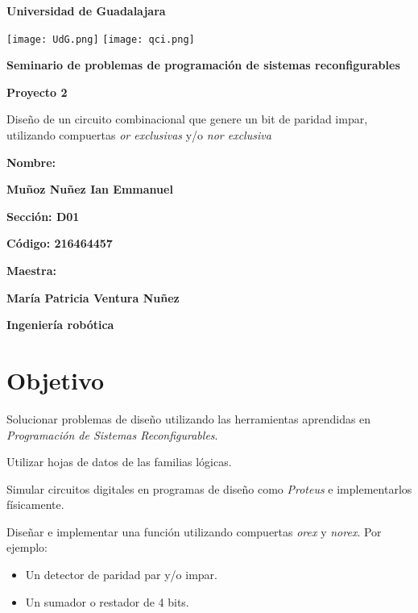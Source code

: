 \documentclass[12pt, oneside, openany]{article}
\begin{document}
\begin{titlepage}
    \centering
    {\bfseries\LARGE Universidad de Guadalajara \par}
    \vfill
    {
        \texttt{[image: UdG.png]}
        \texttt{[image: qci.png]}
        \par
    }
    \vfill
    {\bfseries\LARGE Seminario de problemas de programación de sistemas reconfigurables \par}
    \vfill
    {\bfseries\LARGE Proyecto 2 \par}
    \vfill
    {\LARGE Diseño de un circuito combinacional que genere un bit de paridad impar, utilizando compuertas \emph{or exclusivas} y/o \emph{nor exclusiva} \par}
    \vfill
    {\bfseries\LARGE Nombre: \par}
    \vfill
    {\bfseries\LARGE Muñoz Nuñez Ian Emmanuel \par}
    \vfill
    {\bfseries\LARGE Sección: D01 \par}
    \vfill
    {\bfseries\LARGE Código: 216464457 \par}
    \vfill
    {\bfseries\LARGE Maestra: \par}
    \vfill
    {\bfseries\LARGE María Patricia Ventura Nuñez \par}
    \vfill
    {\bfseries\LARGE Ingeniería robótica \par}
\end{titlepage}

\newpage

\section{Objetivo}
{\sffamily\Large
    \hspace{0.5cm} Solucionar problemas de diseño utilizando las herramientas aprendidas en \emph{Programación de Sistemas Reconfigurables}.
    
    \hspace{0.5cm} Utilizar hojas de datos de las familias lógicas.
    
    \hspace{0.5cm}Simular circuitos digitales en programas de diseño como \emph{Proteus\texttrademark} e implementarlos físicamente.
    
    \hspace{0.5cm} Diseñar e implementar una función utilizando compuertas \emph{orex} y \emph{norex}. Por ejemplo:
    
    \renewcommand{\labelitemi}{-}
    \begin{itemize}
        \item Un detector de paridad par y/o impar.
        \item Un sumador o restador de 4 bits.
    \end{itemize}
    
}
\end{document}
